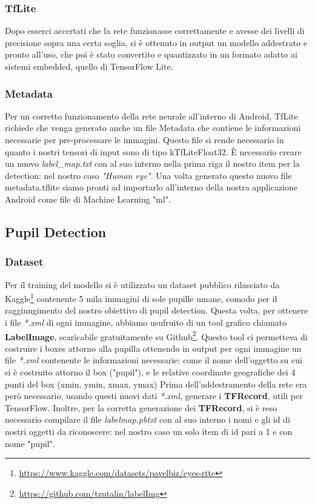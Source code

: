 \documentclass[11pt]{article}
\begin{document}
\subsubsection{TfLite}
Dopo esserci accertati che la rete funzionasse correttamente e avesse dei livelli di precisione sopra una certa soglia, si è ottenuto in output un modello addestrato
e pronto all’uso, che poi è stato convertito e quantizzato in un formato adatto ai sistemi embedded, quello di TensorFlow Lite.
\subsubsection{Metadata}
Per un corretto funzionamento della rete neurale all'interno di Android, TfLite richiede che venga generato anche un file Metadata che contiene le informazioni necessarie per pre-processare le immagini. Questo file si rende necessario in quanto i nostri tensori di input sono di tipo kTfLiteFloat32. È necessario creare un nuovo \textit{label\_map.txt} con al suo interno nella prima riga il nostro item per la detection: nel nostro caso \textit{"Human eye"}.
\newline
Una volta generato questo nuovo file metadata.tflite siamo pronti ad importarlo all'interno della nostra applicazione Android come file di Machine Learning "ml".

\newpage    
\subsection{Pupil Detection}

\subsubsection{Dataset}
Per il training del modello si è utilizzato un dataset pubblico rilasciato da Kaggle\footnote{\url{https://www.kaggle.com/datasets/pavelbiz/eyes-rtte}} contenente 5 mila immagini di sole pupille umane, comodo per il raggiungimento del nostro obiettivo di pupil detection.
\newline
Questa volta, per ottenere i file \textit{*.xml} di ogni immagine, abbiamo usufruito di un tool grafico chiamato \textbf{LabelImage}, scaricabile gratuitamente su Github\footnote{\url{https://github.com/tzutalin/labelImg}}. Questo tool ci permetteva di costruire i boxes attorno alla pupilla ottenendo in output per ogni immagine un file \textit{*.xml} contenente le informazioni necessarie: come il nome dell'oggetto su cui si è costruito attorno il box ("pupil"), e le relative coordinate geografiche dei 4 punti del box (xmin, ymin, xmax, ymax)
\newline \newline
Prima dell'addestramento della rete era però necessario, usando questi nuovi dati \textit{*.xml}, generare i \textbf{TFRecord}, utili per TensorFlow.
Inoltre, per la corretta generazione dei \textbf{TFRecord}, si è reso necessario compilare il file \textit{labelmap.pbtxt} con al suo interno i nomi e gli id di nostri oggetti da riconoscere: nel nostro caso un solo item di id pari a 1 e con nome "pupil".
\end{document}
